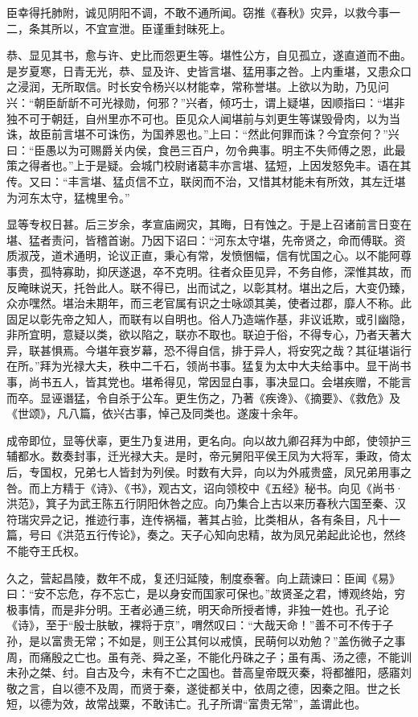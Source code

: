 \documentclass[12pt,UTF8]{ctexbook}
\begin{document}
臣幸得托肺附，诚见阴阳不调，不敢不通所闻。窃推《春秋》灾异，以救今事一二，条其所以，不宜宣泄。臣谨重封昧死上。



恭、显见其书，愈与许、史比而怨更生等。堪性公方，自见孤立，遂直道而不曲。是岁夏寒，日青无光，恭、显及许、史皆言堪、猛用事之咎。上内重堪，又患众口之浸润，无所取信。时长安令杨兴以材能幸，常称誉堪。上欲以为助，乃见问兴：“朝臣龂龂不可光禄勋，何邪？”兴者，倾巧士，谓上疑堪，因顺指曰：“堪非独不可于朝廷，自州里亦不可也。臣见众人闻堪前与刘更生等谋毁骨肉，以为当诛，故臣前言堪不可诛伤，为国养恩也。”上曰：“然此何罪而诛？今宜奈何？”兴曰：“臣愚以为可赐爵关内侯，食邑三百户，勿令典事。明主不失师傅之恩，此最策之得者也。”上于是疑。会城门校尉诸葛丰亦言堪、猛短，上因发怒免丰。语在其传。又曰：“丰言堪、猛贞信不立，联闵而不治，又惜其材能未有所效，其左迁堪为河东太守，猛槐里令。”



显等专权日甚。后三岁余，孝宣庙阙灾，其晦，日有蚀之。于是上召诸前言日变在堪、猛者责问，皆稽首谢。乃因下诏曰：“河东太守堪，先帝贤之，命而傅联。资质淑茂，道术通明，论议正直，秉心有常，发愤悃幅，信有忧国之心。以不能阿尊事贵，孤特寡助，抑厌遂退，卒不克明。往者众臣见异，不务自修，深惟其故，而反晻昧说天，托咎此人。联不得已，出而试之，以彰其材。堪出之后，大变仍臻，众亦嘿然。堪治未期年，而三老官属有识之士咏颂其美，使者过郡，靡人不称。此固足以彰先帝之知人，而联有以自明也。俗人乃造端作基，非议诋欺，或引幽隐，非所宜明，意疑以类，欲以陷之，联亦不取也。联迫于俗，不得专心，乃者天著大异，联甚惧焉。今堪年衰岁幕，恐不得自信，排于异人，将安究之哉？其征堪诣行在所。”拜为光禄大夫，秩中二千石，领尚书事。猛复为太中大夫给事中。显干尚书事，尚书五人，皆其党也。堪希得见，常因显白事，事决显口。会堪疾赠，不能言而卒。显诬谮猛，令自杀于公车。更生伤之，乃著《疾谗》、《摘要》、《救危》及《世颂》，凡八篇，依兴古事，悼己及同类也。遂废十余年。



成帝即位，显等伏辜，更生乃复进用，更名向。向以故九卿召拜为中郎，使领护三辅都水。数奏封事，迁光禄大夫。是时，帝元舅阳平侯王凤为大将军，秉政，倚太后，专国权，兄弟七人皆封为列侯。时数有大异，向以为外戚贵盛，凤兄弟用事之咎。而上方精于《诗》、《书》，观古文，诏向领校中《五经》秘书。向见《尚书·洪范》，箕子为武王陈五行阴阳休咎之应。向乃集合上古以来历春秋六国至秦、汉符瑞灾异之记，推迹行事，连传祸福，著其占验，比类相从，各有条目，凡十一篇，号曰《洪范五行传论》，奏之。天子心知向忠精，故为凤兄弟起此论也，然终不能夺王氏权。



久之，营起昌陵，数年不成，复还归延陵，制度泰奢。向上蔬谏曰：臣闻《易》曰：“安不忘危，存不忘亡，是以身安而国家可保也。”故贤圣之君，博观终始，穷极事情，而是非分明。王者必通三统，明天命所授者博，非独一姓也。孔子论《诗》，至于“殷士肤敏，裸将于京”，喟然叹曰：“大哉天命！”善不可不传于子孙，是以富贵无常；不如是，则王公其何以戒慎，民萌何以劝勉？”盖伤微子之事周，而痛殷之亡也。虽有尧、舜之圣，不能化丹硃之子；虽有禹、汤之德，不能训未孙之桀、纣。自古及今，未有不亡之国也。昔高皇帝既灭秦，将都雒阳，感寤刘敬之言，自以德不及周，而贤于秦，遂徙都关中，依周之德，因秦之阻。世之长短，以德为效，故常战粟，不敢讳亡。孔子所谓“富贵无常”，盖谓此也。
\end{document}
